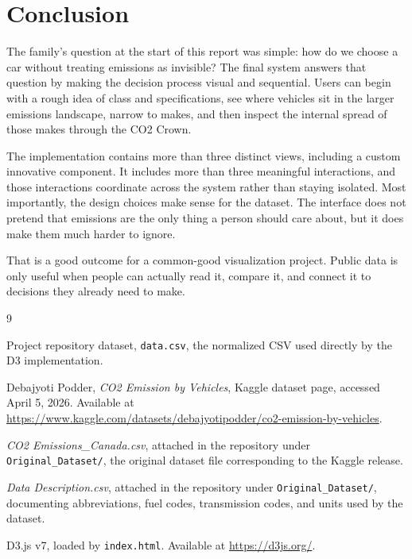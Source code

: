 \documentclass[12pt,letterpaper]{article}
\begin{document}
\section{Conclusion}
The family's question at the start of this report was simple: how do we choose a car without treating emissions as invisible? The final system answers that question by making the decision process visual and sequential. Users can begin with a rough idea of class and specifications, see where vehicles sit in the larger emissions landscape, narrow to makes, and then inspect the internal spread of those makes through the CO2 Crown.

The implementation contains more than three distinct views, including a custom innovative component. It includes more than three meaningful interactions, and those interactions coordinate across the system rather than staying isolated. Most importantly, the design choices make sense for the dataset. The interface does not pretend that emissions are the only thing a person should care about, but it does make them much harder to ignore.

That is a good outcome for a common-good visualization project. Public data is only useful when people can actually read it, compare it, and connect it to decisions they already need to make.

\begin{thebibliography}{9}

Project repository dataset, \texttt{data.csv}, the normalized CSV used directly by the D3 implementation.

Debajyoti Podder, \emph{CO2 Emission by Vehicles}, Kaggle dataset page, accessed April 5, 2026. Available at \url{https://www.kaggle.com/datasets/debajyotipodder/co2-emission-by-vehicles}.

\emph{CO2 Emissions\_Canada.csv}, attached in the repository under \texttt{Original\_Dataset/}, the original dataset file corresponding to the Kaggle release.

\emph{Data Description.csv}, attached in the repository under \texttt{Original\_Dataset/}, documenting abbreviations, fuel codes, transmission codes, and units used by the dataset.

D3.js v7, loaded by \texttt{index.html}. Available at \url{https://d3js.org/}.

\end{thebibliography}
\end{document}
